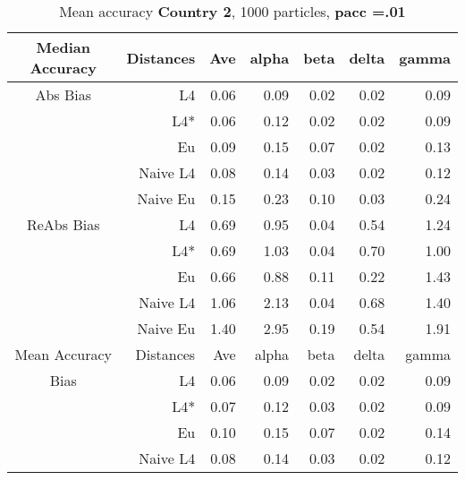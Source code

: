 \documentclass[a4paper,12pt,twoside]{book}
\begin{document}

\begin{table}[H]

\centering
\vfill
\caption{Mean  accuracy \textbf{Country 2}, 1000 particles, \textbf{pacc =.01}}


\begin{tabular}{crrrrrr}
  \hline
  
{\color{blue}Median Accuracy} & Distances & Ave & alpha & beta & delta & gamma \\ 
  \hline
{\color{blue}Abs Bias} & L4  & 0.06 & 0.09 & 0.02 & 0.02 & 0.09 \\ 
  
&L4*  &0.06 & 0.12 & 0.02 & 0.02 & 0.09 \\ 
 
&Eu &  0.09 & 0.15 & 0.07 & 0.02 & 0.13 \\ 
  
&Naive L4&      0.08 & 0.14 & 0.03 & 0.02 & 0.12 \\
  
&Naive Eu &  0.15 & 0.23 & 0.10 & 0.03 & 0.24 \\ 
 
   \hline
   
{\color{blue} ReAbs Bias } & L4  &0.69 & 0.95 & 0.04 & 0.54 & 1.24 \\ 
 
&L4*  & 0.69 & 1.03 & 0.04 & 0.70 & 1.00 \\ 
  
&Eu &   
  0.66 & 0.88 & 0.11 & 0.22 & 1.43 \\ 
  
&Naive L4&  1.06 & 2.13 & 0.04 & 0.68 & 1.40 \\
   
&Naive Eu &    1.40 & 2.95 & 0.19 & 0.54 & 1.91 \\ 
   
   \hline
{\color{blue}Mean Accuracy} & Distances & Ave & alpha & beta & delta & gamma \\ 
  \hline
{\color{blue}Bias} & L4  &0.06 & 0.09 & 0.02 & 0.02 & 0.09 \\ 
  
&L4*  &0.07 & 0.12 & 0.03 & 0.02 & 0.09 \\ 
  
  
&Eu & 0.10 & 0.15 & 0.07 & 0.02 & 0.14 \\ 
  
&Naive L4&  
  0.08 & 0.14 & 0.03 & 0.02 & 0.12 \\  
  

\end{tabular}
\end{table}
\end{document}
